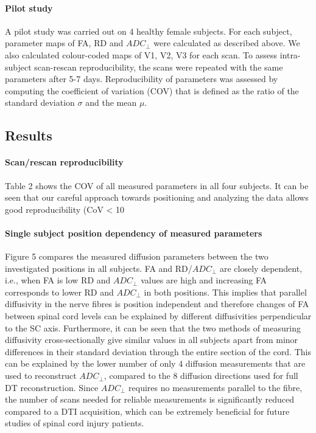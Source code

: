 \paragraph{Pilot study} A pilot study was carried out on 4 healthy female subjects. For each subject, parameter maps of FA, RD and $ADC_\perp$ were calculated as described above. We also calculated colour-coded maps of V1, V2, V3 for each scan. To assess intra-subject scan-rescan reproducibility, the scans were repeated with the same parameters after 5-7 days. Reproducibility of parameters was assessed by computing the coefficient of variation (COV) that is defined as the ratio of the standard deviation $\sigma$ and the mean $\mu$.

\subsection*{Results} 
\paragraph{Scan/rescan reproducibility} Table 2 shows the COV of all measured parameters in all four subjects. It can be seen that our careful approach towards positioning and analyzing the data allows good reproducibility (CoV < 10

\paragraph{Single subject position dependency of measured parameters} Figure 5 compares the measured diffusion parameters between the two investigated positions in all subjects. FA and RD/$ADC_\perp$ are closely dependent, i.e., when FA is low RD and $ADC_\perp$ values are high and increasing FA corresponds to lower RD and $ADC_\perp$ in both positions. This implies that parallel diffusivity in the nerve fibres is position independent and therefore changes of FA between spinal cord levels can be explained by different diffusivities perpendicular to the SC axis. Furthermore, it can be seen that the two methods of measuring diffusivity cross-sectionally give similar values in all subjects apart from minor differences in their standard deviation through the entire section of the cord. This can be explained by the lower number of only 4 diffusion measurements that are used to reconstruct $ADC_\perp$, compared to the 8 diffusion directions used for full DT reconstruction. Since $ADC_\perp$ requires no measurements parallel to the fibre, the number of scans needed for reliable measurements is significantly reduced compared to a DTI acquisition, which can be extremely beneficial for future studies of spinal cord injury patients. 
